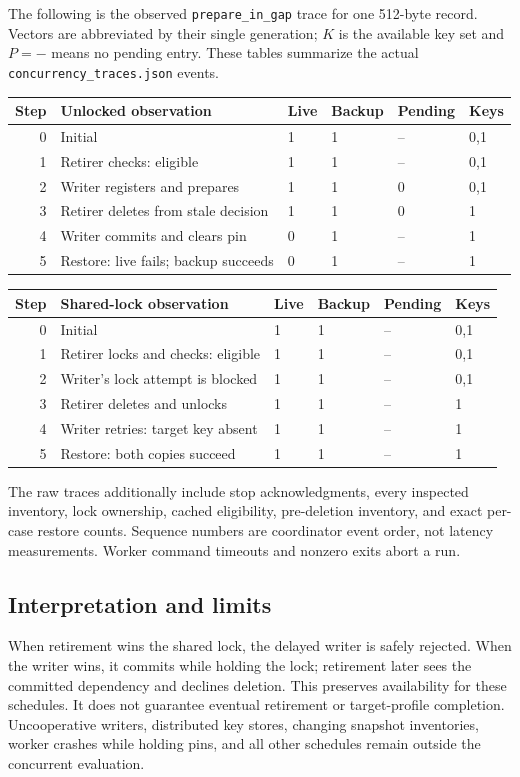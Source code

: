 \documentclass[10pt]{article}
\begin{document}
The following is the observed \texttt{prepare\_in\_gap} trace for one 512-byte
record. Vectors are abbreviated by their single generation; $K$ is the available
key set and $P=-$ means no pending entry. These tables summarize the actual
\texttt{concurrency\_traces.json} events.
\begin{center}\begin{tabular}{@{}rlllll@{}}
\toprule
Step & Unlocked observation & Live & Backup & Pending & Keys\\
\midrule
0 & Initial & 1 & 1 & -- & 0,1\\
1 & Retirer checks: eligible & 1 & 1 & -- & 0,1\\
2 & Writer registers and prepares & 1 & 1 & 0 & 0,1\\
3 & Retirer deletes from stale decision & 1 & 1 & 0 & 1\\
4 & Writer commits and clears pin & 0 & 1 & -- & 1\\
5 & Restore: live fails; backup succeeds & 0 & 1 & -- & 1\\
\bottomrule\end{tabular}\end{center}
\begin{center}\begin{tabular}{@{}rlllll@{}}
\toprule
Step & Shared-lock observation & Live & Backup & Pending & Keys\\
\midrule
0 & Initial & 1 & 1 & -- & 0,1\\
1 & Retirer locks and checks: eligible & 1 & 1 & -- & 0,1\\
2 & Writer's lock attempt is blocked & 1 & 1 & -- & 0,1\\
3 & Retirer deletes and unlocks & 1 & 1 & -- & 1\\
4 & Writer retries: target key absent & 1 & 1 & -- & 1\\
5 & Restore: both copies succeed & 1 & 1 & -- & 1\\
\bottomrule\end{tabular}\end{center}
The raw traces additionally include stop acknowledgments, every inspected
inventory, lock ownership, cached eligibility, pre-deletion inventory, and exact
per-case restore counts. Sequence numbers are coordinator event order, not
latency measurements. Worker command timeouts and nonzero exits abort a run.

\subsection*{Interpretation and limits}
When retirement wins the shared lock, the delayed writer is safely rejected.
When the writer wins, it commits while holding the lock; retirement later sees
the committed dependency and declines deletion. This preserves availability
for these schedules. It does not guarantee eventual retirement or target-profile
completion. Uncooperative writers, distributed key stores, changing snapshot
inventories, worker crashes while holding pins, and all other schedules remain
outside the concurrent evaluation.
\end{document}

